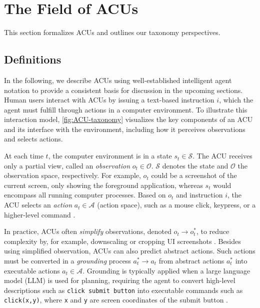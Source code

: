 
\section{The Field of ACUs}
\label{sec:field}

This section formalizes ACUs and outlines our taxonomy perspectives.

\subsection{Definitions}\label{sec:problem_statement}
In the following, we describe ACUs using well-established intelligent agent notation \citep{russell_artificial_2022,sutton_reinforcement_2018} to provide a consistent basis for discussion in the upcoming sections. Human users interact with ACUs by issuing a text-based instruction $i$, which the agent must fulfill through actions in a computer environment. To illustrate this interaction model, \cref{fig:ACU-taxonomy} visualizes the key components of an ACU and its interface with the environment, including how it perceives observations and selects actions.


At each time $t$, the computer environment is in a state $s_t \in \mathcal{S}$. 
The ACU receives only a partial view, called an \emph{observation} $o_t \in \mathcal{O}$. 
$\mathcal{S}$ denotes the state and $\mathcal{O}$ the observation space, respectively.
For example, $o_t$ could be a screenshot of the current screen, only showing the foreground application, whereas $s_t$ would encompass all running computer processes.
Based on $o_t$ and instruction $i$, the ACU selects an \emph{action} $a_t \in \mathcal{A}$ (action space), such as a mouse click, keypress, or a higher-level command .

In practice, ACUs often \emph{simplify} observations, denoted $o_t \rightarrow o_t^*$,  to reduce complexity by, for example, downscaling or cropping UI screenshots .
Besides using simplified observation, ACUs can also predict abstract actions.
Such actions must be converted in a \emph{grounding} process $a_t^* \rightarrow a_t$ from abstract actions $a_t^*$ into executable actions $a_t \in \mathcal{A}$.
Grounding is typically applied when a large language model (LLM) is used for planning, requiring the agent to convert high-level descriptions such as \texttt{click submit button} into executable commands such as \texttt{click(x,y)}, where \texttt{x} and \texttt{y} are screen coordinates of the submit button .


